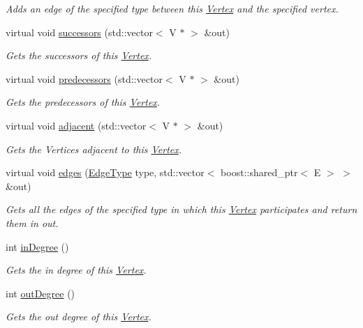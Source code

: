 \begin{DoxyCompactItemize}
\begin{DoxyCompactList}\small\item\em Adds an edge of the specified type between this \hyperlink{classrepast_1_1_vertex}{Vertex} and the specified vertex. \end{DoxyCompactList}\item 
virtual void \hyperlink{classrepast_1_1_directed_vertex_a40dc1f60f518eda0ccbf20622ea82839}{successors} (std\-::vector$<$ V $\ast$ $>$ \&out)
\begin{DoxyCompactList}\small\item\em Gets the successors of this \hyperlink{classrepast_1_1_vertex}{Vertex}. \end{DoxyCompactList}\item 
virtual void \hyperlink{classrepast_1_1_directed_vertex_a2b8af860460fa13b4c5e248e266d2ee2}{predecessors} (std\-::vector$<$ V $\ast$ $>$ \&out)
\begin{DoxyCompactList}\small\item\em Gets the predecessors of this \hyperlink{classrepast_1_1_vertex}{Vertex}. \end{DoxyCompactList}\item 
virtual void \hyperlink{classrepast_1_1_directed_vertex_aded5ff0954773ccc6d0e621950e61659}{adjacent} (std\-::vector$<$ V $\ast$ $>$ \&out)
\begin{DoxyCompactList}\small\item\em Gets the Vertices adjacent to this \hyperlink{classrepast_1_1_vertex}{Vertex}. \end{DoxyCompactList}\item 
virtual void \hyperlink{classrepast_1_1_directed_vertex_abdfdf5f45ddd9026017a2ce62e3c5b7e}{edges} (\hyperlink{classrepast_1_1_vertex_a8b4819d648c7c0dd8b0622beea77cc14}{Edge\-Type} type, std\-::vector$<$ boost\-::shared\-\_\-ptr$<$ E $>$ $>$ \&out)
\begin{DoxyCompactList}\small\item\em Gets all the edges of the specified type in which this \hyperlink{classrepast_1_1_vertex}{Vertex} participates and return them in out. \end{DoxyCompactList}\item 
int \hyperlink{classrepast_1_1_directed_vertex_afd409d365742f1b247734c1283cc059a}{in\-Degree} ()
\begin{DoxyCompactList}\small\item\em Gets the in degree of this \hyperlink{classrepast_1_1_vertex}{Vertex}. \end{DoxyCompactList}\item 
int \hyperlink{classrepast_1_1_directed_vertex_a2debe4c699a8cafd8e7bad11f15deca8}{out\-Degree} ()
\begin{DoxyCompactList}\small\item\em Gets the out degree of this \hyperlink{classrepast_1_1_vertex}{Vertex}. \end{DoxyCompactList}\end{DoxyCompactItemize}


